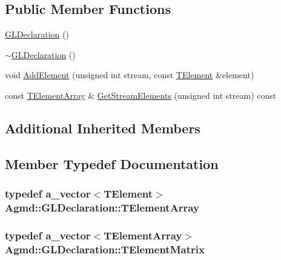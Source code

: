 \subsection*{Public Member Functions}
\begin{DoxyCompactItemize}
\item 
\hyperlink{class_agmd_1_1_g_l_declaration_a8b1a93c0763614e27e55da54d17ce7bf}{G\+L\+Declaration} ()
\item 
\hyperlink{class_agmd_1_1_g_l_declaration_a9c48ca2d745ae06a7941ff547c822d06}{$\sim$\+G\+L\+Declaration} ()
\item 
void \hyperlink{class_agmd_1_1_g_l_declaration_aa74b234c966c2af032236825059304dd}{Add\+Element} (unsigned int stream, const \hyperlink{struct_agmd_1_1_g_l_declaration_1_1_t_element}{T\+Element} \&element)
\item 
const \hyperlink{class_agmd_1_1_g_l_declaration_ac27d21b565226320017925e6d79cf5ec}{T\+Element\+Array} \& \hyperlink{class_agmd_1_1_g_l_declaration_a923e4f7ca34d2a9e8276f9b3bb5fed0a}{Get\+Stream\+Elements} (unsigned int stream) const 
\end{DoxyCompactItemize}
\subsection*{Additional Inherited Members}


\subsection{Member Typedef Documentation}
\hypertarget{class_agmd_1_1_g_l_declaration_ac27d21b565226320017925e6d79cf5ec}{
\subsubsection[{T\+Element\+Array}]{\setlength{\rightskip}{0pt plus 5cm}typedef {\bf a\+\_\+vector}$<${\bf T\+Element}$>$ {\bf Agmd\+::\+G\+L\+Declaration\+::\+T\+Element\+Array}}}\label{class_agmd_1_1_g_l_declaration_ac27d21b565226320017925e6d79cf5ec}
\hypertarget{class_agmd_1_1_g_l_declaration_a8efdeef74a5b78ebe90c301ba7a3331f}{
\subsubsection[{T\+Element\+Matrix}]{\setlength{\rightskip}{0pt plus 5cm}typedef {\bf a\+\_\+vector}$<${\bf T\+Element\+Array}$>$ {\bf Agmd\+::\+G\+L\+Declaration\+::\+T\+Element\+Matrix}}}\label{class_agmd_1_1_g_l_declaration_a8efdeef74a5b78ebe90c301ba7a3331f}


